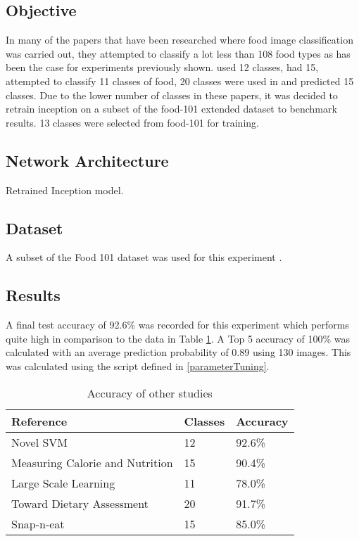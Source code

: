 \subsection*{Objective}
In many of the papers that have been researched where food image classification was carried out, they attempted to classify a lot less than 108 food types as has been the case for experiments previously shown.
\parencite{novelSVM} used 12 classes, \parencite{pouladzadeh2014measuring} had 15, \parencite{LSL_2015} attempted to classify 11 classes of food, 20 classes were used in \parencite{chen2010toward} and \parencite{snap} predicted 15 classes.
Due to the lower number of classes in these papers, it was decided to retrain inception on a subset of the food-101 extended dataset to benchmark results.
13 classes were selected from food-101 for training.

\subsection*{Network Architecture}
Retrained Inception model.

\subsection*{Dataset}
A subset of the Food 101 dataset was used for this experiment \parencite{food101}.

\subsection*{Results}
A final test accuracy of 92.6\% was recorded for this experiment which performs quite high in comparison to the data in Table \ref{classes_accuracy}.
A Top 5 accuracy of 100\% was calculated with an average prediction probability of 0.89 using 130 images.
This was calculated using the script defined in \ref{parameterTuning}.

\begin{table}[]
\centering
\caption{Accuracy of other studies}
\label{classes_accuracy}
\begin{tabular}{|l|l|l|}
\hline
\textbf{Reference}                       & \textbf{Classes} & \textbf{Accuracy}      \\ \hline
Novel SVM                       & 12      & 92.6\%        \\ \hline
Measuring Calorie and Nutrition & 15      & 90.4\%       \\ \hline
Large Scale Learning            & 11      & 78.0\%          \\ \hline
Toward Dietary Assessment       & 20      & 91.7\% \\ \hline
Snap-n-eat                      & 15      & 85.0\%         \\ \hline
\end{tabular}
\end{table}

